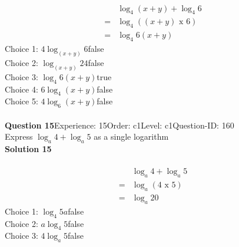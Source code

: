 \documentclass{article}
\begin{document}
\\[-35pt]\begin{align*}
&\log_{4}(x+y)+\log_{4}6\\[2pt]
=&\log_{4}((x+y) \,\, \text{x} \,\, 6)\\[2pt]
=&\log_{4}6(x+y)
\end{align*}
Choice 1: \hspace{20pt}$4\log_{(x+y)}6$\hspace{20pt}false\\
Choice 2: \hspace{20pt}$\log_{(x+y)}24$\hspace{20pt}false\\
Choice 3: \hspace{20pt}$\log_{4}6(x+y)$\hspace{20pt}true\\
Choice 4: \hspace{20pt}$6\log_{4}(x+y)$\hspace{20pt}false\\
Choice 5: \hspace{20pt}$4\log_{6}(x+y)$\hspace{20pt}false\\
\\[4pt]
\noindent\textbf{Question 15}\hspace{20pt}Experience: 15\hspace{20pt}Order: c1\hspace{20pt}Level: c1\hspace{20pt}Question-ID: 160\\[2pt]
Express $\log_{a}4+\log_{a}5$ as a single logarithm\\[4pt]
\noindent\textbf{Solution 15}\\[2pt]
\\[-35pt]\begin{align*}
&\log_{a}4+\log_{a}5\\[2pt]
=&\log_{a}(4 \,\, \text{x} \,\, 5)\\[2pt]
=&\log_{a}20
\end{align*}
Choice 1: \hspace{20pt}$\log_{4}5a$\hspace{20pt}false\\
Choice 2: \hspace{20pt}$a\log_{4}5$\hspace{20pt}false\\
Choice 3: \hspace{20pt}$4\log_{a}5$\hspace{20pt}false\\
\end{document}
